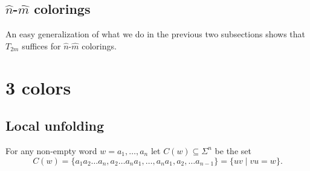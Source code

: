 \documentclass[a4paper]{article}
\begin{document}
\subsection{$\hat{n}$-$\hat{m}$ colorings}

An easy generalization of what we do in the previous two subsections shows
that $T_{2m}$ suffices for $\hat{n}$-$\hat{m}$ colorings.


\section{3 colors}

\subsection{Local unfolding}

For any non-empty word $w = a_1,\dots,a_n$ let $C(w) \subseteq \Sigma^n$
be the set
\[
 C(w) = \{a_1 a_2 \dots a_n, a_2 \dots a_n a_1, \dots, a_n a_1, a_2,
\dots a_{n - 1}\} = \{u v \mid v u = w\}.
\]
\end{document}
